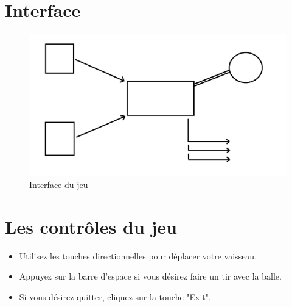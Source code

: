 \section{Interface}
\begin{figure}[!h]
\begin{center}
\includegraphics[width=15cm]{presentation/schema}
\end{center}
\caption{Interface du jeu}
\end{figure}

\section {Les contrôles du jeu}

\begin{itemize}
\item Utilisez les touches directionnelles pour déplacer votre vaisseau.
\item Appuyez sur la barre d'espace si vous désirez faire un tir avec la balle.
\item Si vous désirez quitter, cliquez sur la touche "Exit".
\end{itemize}

